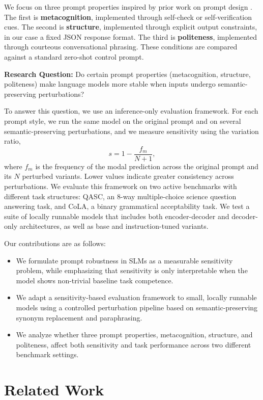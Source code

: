 \documentclass[11pt]{article}
\begin{document}
We focus on three prompt properties inspired by prior work on prompt design \citep{long-etal-2025-makes}. The first is \textbf{metacognition}, implemented through self-check or self-verification cues. The second is \textbf{structure}, implemented through explicit output constraints, in our case a fixed JSON response format. The third is \textbf{politeness}, implemented through courteous conversational phrasing. These conditions are compared against a standard zero-shot control prompt.

\textbf{Research Question:} Do certain prompt properties (metacognition, structure, politeness) make language models more stable when inputs undergo semantic-preserving perturbations?

To answer this question, we use an inference-only evaluation framework. For each prompt style, we run the same model on the original prompt and on several semantic-preserving perturbations, and we measure sensitivity using the variation ratio,
\[
s = 1 - \frac{f_m}{N+1},
\]
where $f_m$ is the frequency of the modal prediction across the original prompt and its $N$ perturbed variants. Lower values indicate greater consistency across perturbations. We evaluate this framework on two active benchmarks with different task structures: QASC, an 8-way multiple-choice science question answering task, and CoLA, a binary grammatical acceptability task. We test a suite of locally runnable models that includes both encoder-decoder and decoder-only architectures, as well as base and instruction-tuned variants.

Our contributions are as follows:
\begin{itemize}
    \item We formulate prompt robustness in SLMs as a measurable sensitivity problem, while emphasizing that sensitivity is only interpretable when the model shows non-trivial baseline task competence.
    \item We adapt a sensitivity-based evaluation framework to small, locally runnable models using a controlled perturbation pipeline based on semantic-preserving synonym replacement and paraphrasing.
    \item We analyze whether three prompt properties, metacognition, structure, and politeness, affect both sensitivity and task performance across two different benchmark settings.
\end{itemize}

\section{Related Work}
\end{document}
